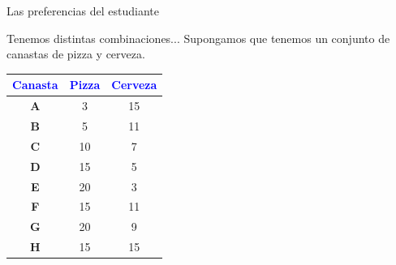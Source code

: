 \documentclass{beamer}
\begin{document}
\begin{frame}{Las preferencias del estudiante}
    \begin{center}
    \end{center}
\end{frame}

\begin{frame}{Tenemos distintas combinaciones...}
    Supongamos que tenemos un conjunto de canastas de pizza y cerveza. 
    \begin{center}
        \renewcommand{\arraystretch}{1.5} %
        \setlength{\arrayrulewidth}{1pt} %
        \setlength{\tabcolsep}{10pt} %
        \begin{tabular}{>{\bfseries}c|c|c}
            \textbf{\textcolor{blue}{Canasta}} & \textbf{\textcolor{blue}{Pizza}} & \textbf{\textcolor{blue}{Cerveza}} \\
            \hline
            A & 3  & 15  \\
            B & 5  & 11  \\
            C & 10 & 7   \\
            D & 15 & 5   \\
            E & 20 & 3   \\
            F & 15 & 11  \\
            G & 20 & 9   \\
            H & 15 & 15  \\
        \end{tabular}
    \end{center}
\end{frame}
\end{document}
